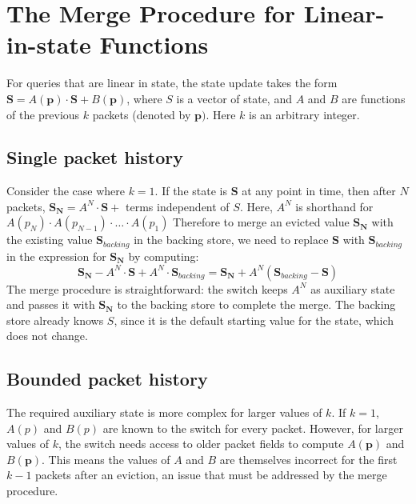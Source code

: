 
\chapter{The Merge Procedure for Linear-in-state Functions}
\label{app:merge}

For queries that are linear in state, the state update takes the form $\mathbf{S} = A(\mathbf{p})\cdot\mathbf{S} + B(\mathbf{p})$, where $S$ is a vector of state, and $A$ and $B$ are functions of the previous $k$ packets (denoted by $\mathbf{p})$. Here $k$ is an arbitrary integer.

\section{Single packet history}

Consider the case where $k = 1$. If the state is $\mathbf{S}$ at any point in time, then after $N$ packets,
$\mathbf{S_N} = A^N\cdot \mathbf{S} + $ terms independent of $S$. Here, $A^N$ is shorthand for $A(p_N)\cdot A(p_{N-1}) \cdot \ldots \cdot A(p_1)$
Therefore to merge an evicted value $\mathbf{S_N}$ with the existing value $\mathbf{S}_{backing}$ in the backing store,
we need to replace $\mathbf{S}$ with $\mathbf{S}_{backing}$ in the expression for $\mathbf{S_N}$ by computing:
\[ \mathbf{S_N} - A^N \cdot \mathbf{S} + A^N \cdot \mathbf{S}_{backing} = \mathbf{S_N} + A^N(\mathbf{S}_{backing} - \mathbf{S}) \]
The merge procedure is straightforward: the switch keeps $A^N$ as auxiliary state and passes it with $\mathbf{S_N}$ to the backing store to complete the merge.
The backing store already knows $S$, since it is the default starting value for the state, which does not change.

\section{Bounded packet history}

The required auxiliary state is more complex for larger values of $k$. If $k = 1$, $A(p)$ and $B(p)$ are known to the switch for every packet. However, for larger values of $k$, the switch needs access to older packet fields to compute $A(\mathbf{p})$ and $B(\mathbf{p})$. This means the values of $A$ and $B$ are themselves incorrect for the first $k-1$ packets after an eviction, an issue that must be addressed by the merge procedure.

